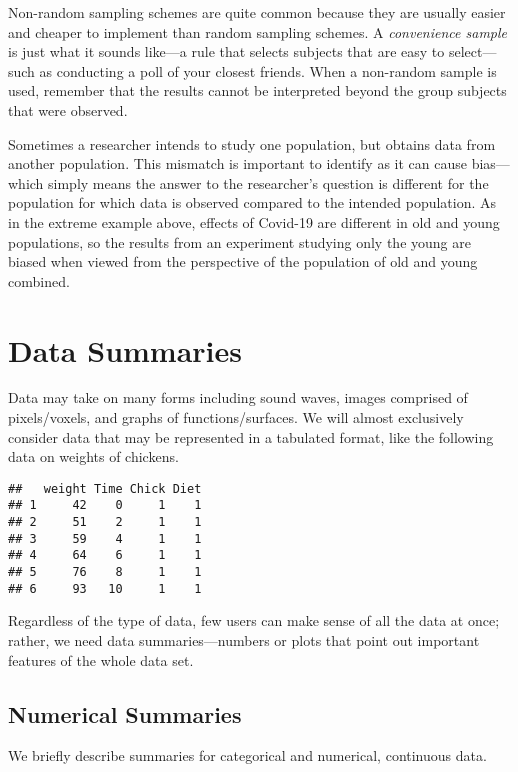 \documentclass[
]{book}
\begin{document}
Non-random sampling schemes are quite common because they are usually easier and cheaper to implement than random sampling schemes. A \emph{convenience sample} is just what it sounds like---a rule that selects subjects that are easy to select---such as conducting a poll of your closest friends. When a non-random sample is used, remember that the results cannot be interpreted beyond the group subjects that were observed.

Sometimes a researcher intends to study one population, but obtains data from another population. This mismatch is important to identify as it can cause bias---which simply means the answer to the researcher's question is different for the population for which data is observed compared to the intended population. As in the extreme example above, effects of Covid-19 are different in old and young populations, so the results from an experiment studying only the young are biased when viewed from the perspective of the population of old and young combined.

\hypertarget{data-summaries}{%
\section{Data Summaries}\label{data-summaries}}

Data may take on many forms including sound waves, images comprised of pixels/voxels, and graphs of functions/surfaces. We will almost exclusively consider data that may be represented in a tabulated format, like the following data on weights of chickens.

\begin{verbatim}
##   weight Time Chick Diet
## 1     42    0     1    1
## 2     51    2     1    1
## 3     59    4     1    1
## 4     64    6     1    1
## 5     76    8     1    1
## 6     93   10     1    1
\end{verbatim}

Regardless of the type of data, few users can make sense of all the data at once; rather, we need data summaries---numbers or plots that point out important features of the whole data set.

\hypertarget{numerical-summaries}{%
\subsection{Numerical Summaries}\label{numerical-summaries}}

We briefly describe summaries for categorical and numerical, continuous data.
\end{document}
